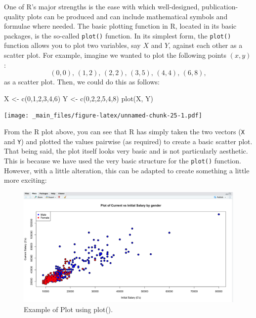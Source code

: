 \documentclass[
]{book}
\newenvironment{Shaded}{\begin{snugshade}}{\end{snugshade}}
\newcommand{\DecValTok}[1]{\textcolor[rgb]{0.00,0.00,0.81}{#1}}
\newcommand{\FunctionTok}[1]{\textcolor[rgb]{0.00,0.00,0.00}{#1}}
\newcommand{\NormalTok}[1]{#1}
\newcommand{\OtherTok}[1]{\textcolor[rgb]{0.56,0.35,0.01}{#1}}
\theoremstyle{definition}
\theoremstyle{definition}
\theoremstyle{definition}
\theoremstyle{definition}
\theoremstyle{remark}
\begin{document}
One of R's major strengths is the ease with which well-designed, publication-quality plots can be produced and can include mathematical symbols and formulae where needed. The basic plotting function in R, located in its basic packages, is the so-called \texttt{plot()} function. In its simplest form, the \texttt{plot()} function allows you to plot two variables, say \(X\) and \(Y\), against each other as a scatter plot. For example, imagine we wanted to plot the following points \((x,y)\):
\begin{equation*}
(0,0), \,(1,2),\, (2,2),\, (3, 5),\, (4, 4),\, (6, 8),
\end{equation*}
as a scatter plot. Then, we could do this as follows:

\begin{Shaded}
\begin{Highlighting}[]
\NormalTok{X }\OtherTok{\textless{}{-}} \FunctionTok{c}\NormalTok{(}\DecValTok{0}\NormalTok{,}\DecValTok{1}\NormalTok{,}\DecValTok{2}\NormalTok{,}\DecValTok{3}\NormalTok{,}\DecValTok{4}\NormalTok{,}\DecValTok{6}\NormalTok{)}
\NormalTok{Y }\OtherTok{\textless{}{-}} \FunctionTok{c}\NormalTok{(}\DecValTok{0}\NormalTok{,}\DecValTok{2}\NormalTok{,}\DecValTok{2}\NormalTok{,}\DecValTok{5}\NormalTok{,}\DecValTok{4}\NormalTok{,}\DecValTok{8}\NormalTok{)}
\FunctionTok{plot}\NormalTok{(X, Y)}
\end{Highlighting}
\end{Shaded}

\texttt{[image: \_main\_files/figure-latex/unnamed-chunk-25-1.pdf]}

From the R plot above, you can see that R has simply taken the two vectors (\texttt{X} and \texttt{Y}) and plotted the values pairwise (as required) to create a basic scatter plot. That being said, the plot itself looks very basic and is not particularly aesthetic. This is because we have used the very basic structure for the \texttt{plot()} function. However, with a little alteration, this can be adapted to create something a little more exciting:

\begin{figure}

{\centering \includegraphics[width=0.9\linewidth]{Figures/Salary2} 

}

\caption{Example of Plot using plot().}\label{fig:Plot}
\end{figure}
\end{document}
